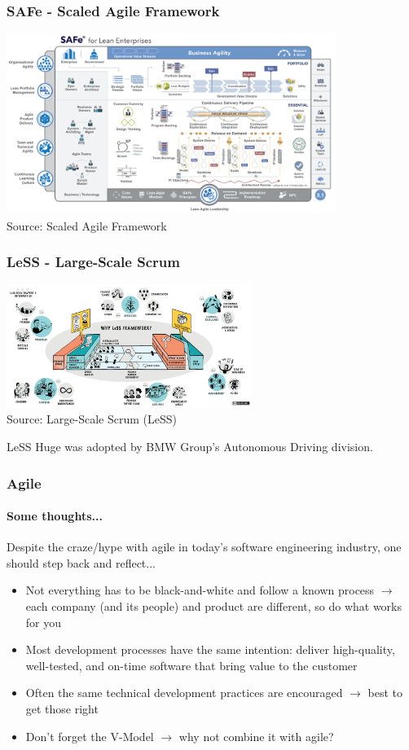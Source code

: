 \begin{frame}
\frametitle{SAFe - Scaled Agile Framework}
\centering
\includegraphics[width=0.8\textwidth]{images/agile-safe.png}\\
\footnotesize Source: Scaled Agile Framework\footnotemark[1]
\end{frame}

\begin{frame}
\frametitle{LeSS - Large-Scale Scrum}
\begin{center}
\includegraphics[width=0.6\textwidth]{images/agile-less.png}\\
\footnotesize Source: Large-Scale Scrum (LeSS)\footnotemark[1]\\
\end{center}
LeSS Huge was adopted by BMW Group's Autonomous Driving division.\footnotemark[2] 
\end{frame}

\begin{frame}
\frametitle{Agile}
\framesubtitle{Some thoughts...}
Despite the craze/hype with agile in today's software engineering industry, one
should step back and reflect...\\
\begin{itemize}
    \item Not everything has to be black-and-white and follow a known process
        $\rightarrow$ each company (and its people) and product are different,
        so do what works for you
    \item Most development processes have the same intention: deliver
        high-quality, well-tested, and on-time software that bring value to the
        customer
    \item Often the same technical development practices are encouraged
        $\rightarrow$ best to get those right
    \item Don't forget the V-Model $\rightarrow$ why not combine it with agile?
\end{itemize}
\end{frame}

